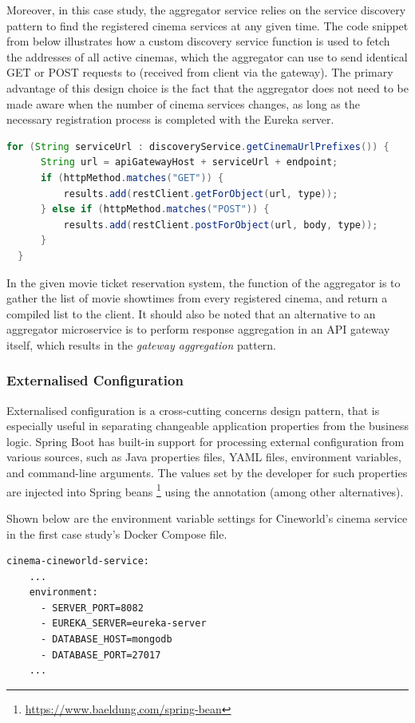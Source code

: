 Moreover, in this case study, the aggregator service relies on the service discovery pattern to find the registered cinema services at any given time. The code snippet from  below illustrates how a custom discovery service function is used to fetch the addresses of all active cinemas, which the aggregator can use to send identical GET or POST requests to (received from client via the gateway). The primary advantage of this design choice is the fact that the aggregator does not need to be made aware when the number of cinema services changes, as long as the necessary registration process is completed with the Eureka server.

\begin{lstlisting}[language=Java, caption=Snippet from \code{AggregatorService.java}]
  for (String serviceUrl : discoveryService.getCinemaUrlPrefixes()) {
      String url = apiGatewayHost + serviceUrl + endpoint;
      if (httpMethod.matches("GET")) {
          results.add(restClient.getForObject(url, type));
      } else if (httpMethod.matches("POST")) {
          results.add(restClient.postForObject(url, body, type));
      }
  }
\end{lstlisting}

In the given movie ticket reservation system, the function of the aggregator is to gather the list of movie showtimes from every registered cinema, and return a compiled list to the client. It should also be noted that an alternative to an aggregator microservice is to perform response aggregation in an API gateway itself, which results in the \textit{gateway aggregation} pattern.

\subsubsection{Externalised Configuration}

Externalised configuration is a cross-cutting concerns design pattern, that is especially useful in separating changeable application properties from the business logic. Spring Boot has built-in support for processing external configuration from various sources, such as Java properties files, YAML files, environment variables, and command-line arguments. The values set by the developer for such properties are injected into Spring beans \footnote{\url{https://www.baeldung.com/spring-bean}} using the  annotation (among other alternatives).

Shown below are the environment variable settings for Cineworld's cinema service in the first case study's Docker Compose file.
\begin{lstlisting}[caption=Snippet from \code{docker-compose.yml}]
  cinema-cineworld-service:
    ...
    environment:
      - SERVER_PORT=8082
      - EUREKA_SERVER=eureka-server
      - DATABASE_HOST=mongodb
      - DATABASE_PORT=27017
    ...
\end{lstlisting}


